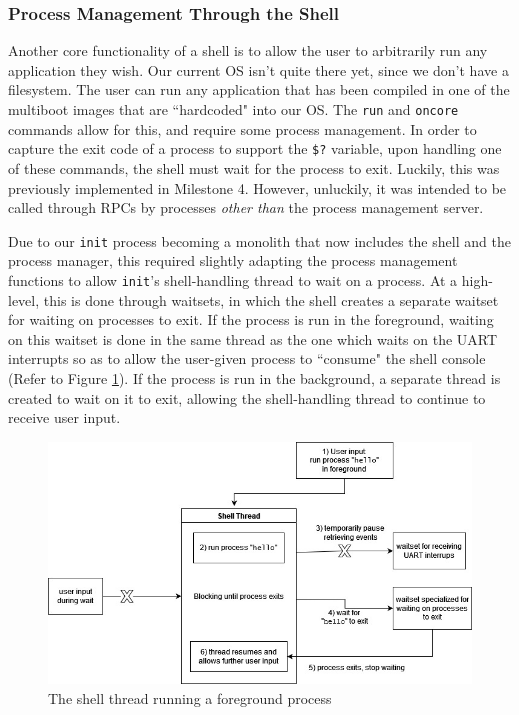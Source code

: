 \subsubsection{Process Management Through the Shell}\label{m7-shell-pm}
Another core functionality of a shell is to allow the user to arbitrarily run any application they wish. Our current OS isn't quite there yet, since we don't have a filesystem. The user can run any application that has been compiled in one of the multiboot images that are ``hardcoded" into our OS.  
The \texttt{run} and \texttt{oncore} commands allow for this, and require some process management. In order to capture the exit code of a process to support the \texttt{\$?} variable, upon handling one of these commands, the shell must wait for the process to exit. Luckily, this was previously implemented in Milestone 4. However, unluckily, it was intended to be called through RPCs by processes \textit{other than} the process management server. 

Due to our \texttt{init} process becoming a monolith that now includes the shell and the process manager, this required slightly adapting the process management functions to allow \texttt{init}'s shell-handling thread to wait on a process. At a high-level, this is done through waitsets, in which the shell creates a separate waitset for waiting on processes to exit. If the process is run in the foreground, waiting on this waitset is done in the same thread as the one which waits on the UART interrupts so as to allow the user-given process to ``consume" the shell console (Refer to Figure \ref{figure:m7-shell-proc-wait}). If the process is run in the background, a separate thread is created to wait on it to exit, allowing the shell-handling thread to continue to receive user input. 

\begin{figure}[ht]
    \centering
    \includegraphics[width=0.8\columnwidth]{images/m7-shell-proc-wait.jpg}
    \caption{The shell thread running a foreground process}
    \label{figure:m7-shell-proc-wait}
\end{figure}

